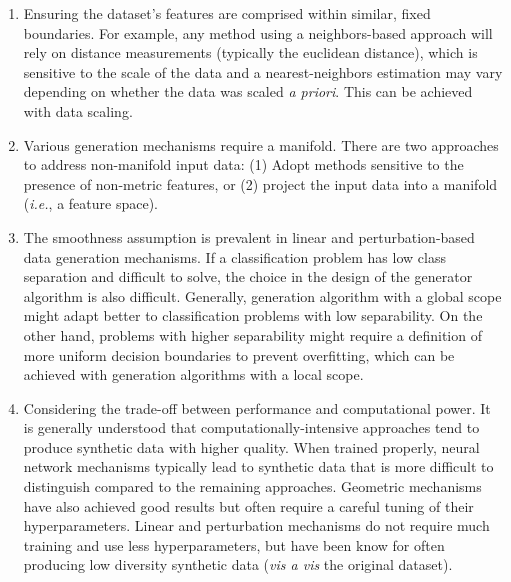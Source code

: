 \documentclass[parskip=full]{scrartcl}
\begin{document}
\begin{enumerate}

    \item Ensuring the dataset's features are comprised within similar, fixed
        boundaries. For example, any method using a neighbors-based approach
        will rely on distance measurements (typically the euclidean distance),
        which is sensitive to the scale of the data and a nearest-neighbors
        estimation may vary depending on whether the data was scaled \textit{a
        priori}. This can be achieved with data scaling. 

    \item Various generation mechanisms require a manifold. There are two
        approaches to address non-manifold input data: (1) Adopt methods
        sensitive to the presence of non-metric features, or (2) project the
        input data into a manifold (\textit{i.e.}, a feature space).

    \item The smoothness assumption is prevalent in linear and
        perturbation-based data generation mechanisms. If a classification
        problem has low class separation and difficult to solve, the choice in
        the design of the generator algorithm is also difficult. Generally,
        generation algorithm with a global scope might adapt better to
        classification problems with low separability. On the other hand,
        problems with higher separability might require a definition of more
        uniform decision boundaries to prevent overfitting, which can be
        achieved with generation algorithms with a local scope.

    \item Considering the trade-off between performance and computational
        power. It is generally understood that computationally-intensive
        approaches tend to produce synthetic data with higher quality. When
        trained properly, neural network mechanisms typically lead to
        synthetic data that is more difficult to distinguish compared to the
        remaining approaches. Geometric mechanisms have also achieved good
        results but often require a careful tuning of their hyperparameters.
        Linear and perturbation mechanisms do not require much training and
        use less hyperparameters, but have been know for often producing low
        diversity synthetic data (\textit{vis a vis} the original dataset).

\end{enumerate}
\end{document}
